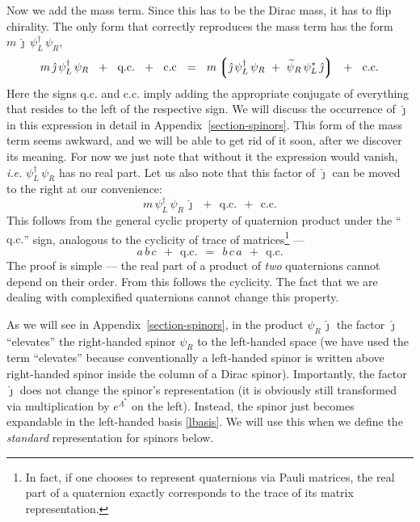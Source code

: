 \documentclass[epsfig,12pt]{article}
\newcommand{\wt}{\widetilde}
\newcommand{\lgr}{\left\lgroup}
\newcommand{\rgr}{\right\rgroup}
\newcommand{\jj}{\hat\jmath}
\begin{document}
	Now we add the mass term.
	Since this has to be the Dirac mass, it has to flip chirality.
	The only form that correctly reproduces the mass term has the form $ m\, \jj\, \psi_L^\dag\, \psi_R $,
\begin{equation}
	m\, \jj\, \psi_L^\dag\, \psi_R  ~~+~~  \text{q.c.}  ~~+~~  \text{c.c}  ~~=~~
	m \lgr \jj\, \psi_L^\dag\, \psi_R  ~+~  \wt\psi{}_R\, \psi_L^*\, \jj \rgr
	~~+~~  \text{c.c.}
\end{equation}
	Here the signs q.c. and c.c. imply adding the appropriate conjugate of everything
	that resides to the left of the respective sign.
	We will discuss the occurrence of $ \jj $ in this expression in detail in Appendix~\ref{section-spinors}.
	This form of the mass term seems awkward, and we will be able to get rid of it soon, after we discover its meaning.
	For now we just note that without it the expression would vanish, \emph{i.e.} $ \psi_L^\dag\, \psi_R $
	has no real part.
	Let us also note that this factor of $ \jj $ can be moved to the right at our convenience:
\begin{equation}
\label{m-term}
	m\, \psi_L^\dag\, \psi_R\, \jj  ~~+~~  \text{q.c.}  ~~+~~  \text{c.c.}
\end{equation}
	This follows from the general cyclic property of quaternion product
	under the ``$ \text{q.c.} $'' sign, analogous to the cyclicity of trace of matrices\footnote{
		In fact, if one chooses to represent quaternions via Pauli matrices, the real
		part of a quaternion exactly corresponds to the trace of its matrix representation.
	} ---
\begin{equation}
	a\, b\, c  ~~+~~  \text{q.c.}	~~=~~	b\, c\, a  ~~+~~  \text{q.c.}
\end{equation}
	The proof is simple --- the real part of a product of \emph{two} quaternions cannot depend
	on their order.
	From this follows the cyclicity.
	The fact that we are dealing with complexified quaternions cannot change this property.

	As we will see in Appendix~\ref{section-spinors}, in the product $ \psi_R\, \jj $ the factor $ \jj $
	``elevates'' the right-handed spinor $ \psi_R $ to the left-handed space
	(we have used the term ``elevates'' because conventionally a left-handed spinor is
	written above right-handed spinor inside the column of a Dirac spinor).
	Importantly, the factor $ \jj $ does not change the spinor's representation (it is obviously still transformed
	via multiplication by $ e^{\Lambda^*} $ on the left).
	Instead, the spinor just becomes expandable in the left-handed basis \eqref{lbasis}.
	We will use this when we define the \emph{standard} representation for spinors below.
\end{document}
